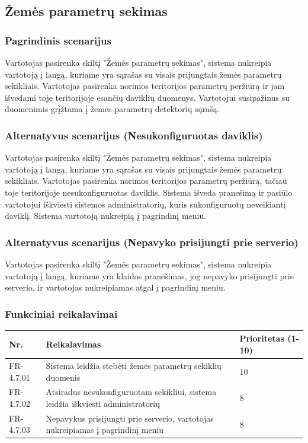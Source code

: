 \documentclass[oneside]{VUMIFPSkursinis}
\begin{document}
\subsection{Žemės parametrų sekimas}
\subsubsection{Pagrindinis scenarijus}
	Vartotojas pasirenka skiltį "Žemės parametrų sekimas", sistema nukreipia vartotoją į langą, kuriame yra sąrašas su visais prijungtais žemės parametrų sekikliais. Vartotojas pasirenka norimos teritorijos parametrų peržiūrą ir jam išvedami toje teritorijoje esančių daviklių duomenys. Vartotojui susipažinus su duomenimis grįžtama į žemės parametrų detektorių sąrašą.
\subsubsection{Alternatyvus scenarijus (Nesukonfiguruotas daviklis)}
	Vartotojas pasirenka skiltį "Žemės parametrų sekimas", sistema nukreipia vartotoją į langą, kuriame yra sąrašas su visais prijungtais žemės parametrų sekikliais. Vartotojas pasirenka norimos teritorijos parametrų peržiūrą, tačiau toje teritorijoje nesukonfiguruotas daviklis. Sistema išveda pranešimą ir pasiūlo vartotojui iškviesti sistemos administratorių, kuris sukonfiguruotų neveikiantį daviklį. Sistema vartotoją nukreipią į pagrindinį meniu.
\subsubsection{Alternatyvus scenarijus (Nepavyko prisijungti prie serverio)}
	Vartotojas pasirenka skiltį "Žemės parametrų sekimas", sistema nukreipia vartotoją į langą, kuriame yra klaidos pranešimas, jog nepavyko prisijungti prie serverio, ir vartotojas nukreipiamas atgal į pagrindinį meniu.
\subsubsection{Funkciniai reikalavimai}
\begin{table}[htbp]
	\begin{tabularx}{1\textwidth}{ |P{2.5cm}|X|P{3cm }| }  \hline
    Nr. & Reikalavimas &  Prioritetas (1-10)  \\   \hline 
    FR-4.7.01 & Sistema leidžia stebėti žemės parametrų sekiklių duomenis & 10  \\   \hline
		FR-4.7.02 & Atsiradus nesukonfiguruotam sekikliui, sistema leidžia iškviesti administratorių & 8 \\  \hline
		FR-4.7.03 & Nepavykus prisijungti prie serverio, vartotojas nukreipiamas į pagrindinį meniu & 8 \\ \hline
	\end{tabularx}
\end{table}
\end{document}
